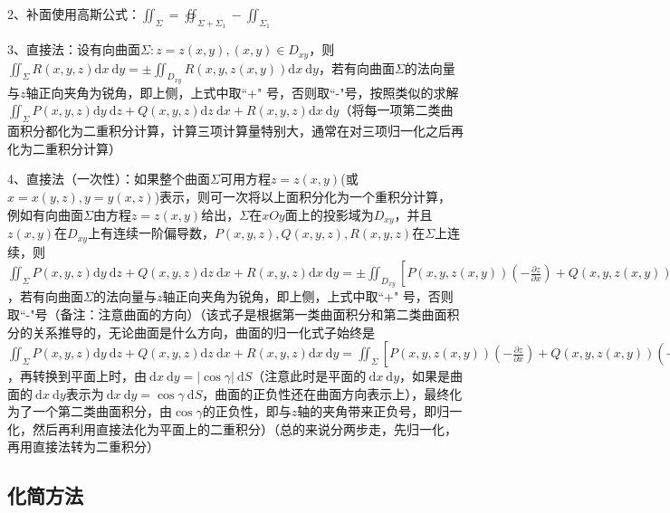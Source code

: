 2、补面使用高斯公式：$\iint_{\Sigma}=\oiint_{\Sigma+\Sigma_{1}}-\iint_{\Sigma_{1}}$

3、直接法：设有向曲面$\Sigma: z=z(x, y),(x, y) \in D_{x y}$，则$\iint_{\Sigma} R(x, y, z) \mathrm{d} x \mathrm{~d} y=\pm \iint_{D_{x y}} R(x, y, z(x, y)) \mathrm{d} x \mathrm{~d} y$，若有向曲面$\Sigma$的法向量与$z$轴正向夹角为锐角，即上侧，上式中取“+" 号，否则取“-"号，按照类似的求解$\iint_{\Sigma} P(x, y, z) \mathrm{d} y \mathrm{~d} z+Q(x, y, z) \mathrm{d} z \mathrm{~d} x+R(x, y, z) \mathrm{d} x \mathrm{~d} y$（将每一项第二类曲面积分都化为二重积分计算，计算三项计算量特别大，通常在对三项归一化之后再化为二重积分计算）

4、直接法（一次性）：如果整个曲面$\Sigma$可用方程$z=z(x, y)$(或$x=x(y, z), y=y(x, z)$)表示，则可一次将以上面积分化为一个重积分计算，例如有向曲面$\Sigma$由方程$z=z(x, y)$给出，$\Sigma$在$x O y$面上的投影域为$D_{x y}$，并且$z(x, y)$在$D_{x y}$上有连续一阶偏导数，$P(x, y, z), Q(x, y, z), R(x, y, z)$在$\Sigma$上连续，则$\iint_{\Sigma} P(x, y, z) \mathrm{d} y \mathrm{~d} z+Q(x, y, z) \mathrm{d} z \mathrm{~d} x+R(x, y, z) \mathrm{d} x \mathrm{~d} y = \pm \iint_{D_{x y}}[P(x, y, z(x, y))\left(-\frac{\partial z}{\partial x}\right)+Q(x, y, z(x, y))\left(-\frac{\partial z}{\partial y}\right)+R(x, y, z(x, y))] \mathrm{d} x \mathrm{~d} y$，若有向曲面$\Sigma$的法向量与$z$轴正向夹角为锐角，即上侧，上式中取“+" 号，否则取“-"号（备注：注意曲面的方向）（该式子是根据第一类曲面积分和第二类曲面积分的关系推导的，无论曲面是什么方向，曲面的归一化式子始终是$\iint_{\Sigma} P(x, y, z) \mathrm{d} y \mathrm{~d} z+Q(x, y, z) \mathrm{d} z \mathrm{~d} x+R(x, y, z) \mathrm{d} x \mathrm{~d} y =  \iint_{\Sigma}[P(x, y, z(x, y))\left(-\frac{\partial z}{\partial x}\right)+Q(x, y, z(x, y))\left(-\frac{\partial z}{\partial y}\right)+R(x, y, z(x, y))] \cos \gamma \ \mathrm{d} S$，再转换到平面上时，由$\mathrm{~d} x \mathrm{~d} y = |\cos \gamma | \ \mathrm{d} S$（注意此时是平面的$\mathrm{~d} x \mathrm{~d} y$，如果是曲面的$\mathrm{~d} x \mathrm{~d} y$表示为$\mathrm{~d} x \mathrm{~d} y = \cos \gamma  \ \mathrm{d} S$，曲面的正负性还在曲面方向表示上），最终化为了一个第二类曲面积分，由$\cos \gamma$的正负性，即与$z$轴的夹角带来正负号，即归一化，然后再利用直接法化为平面上的二重积分）（总的来说分两步走，先归一化，再用直接法转为二重积分）



\subsection{化简方法}

